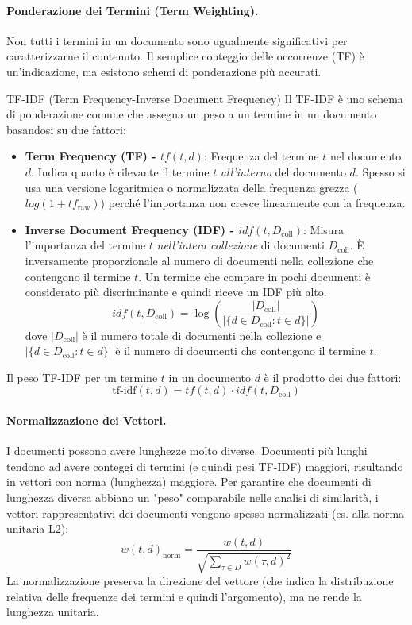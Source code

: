 \documentclass{article}
\begin{document}
\paragraph{Ponderazione dei Termini (Term Weighting).}
Non tutti i termini in un documento sono ugualmente significativi per caratterizzarne il contenuto. Il semplice conteggio delle occorrenze (TF) è un'indicazione, ma esistono schemi di ponderazione più accurati.
\begin{definitionbox}{TF-IDF (Term Frequency-Inverse Document Frequency)}
    Il TF-IDF è uno schema di ponderazione comune che assegna un peso a un termine in un documento basandosi su due fattori:
    \begin{itemize}
        \item \textbf{Term Frequency (TF) - $tf(t,d)$}: Frequenza del termine $t$ nel documento $d$. Indica quanto è rilevante il termine $t$ \textit{all'interno} del documento $d$. Spesso si usa una versione logaritmica o normalizzata della frequenza grezza ($log(1+tf_{\text{raw}})$) perché l'importanza non cresce linearmente con la frequenza.
        \item \textbf{Inverse Document Frequency (IDF) - $idf(t,D_{\text{coll}})$}: Misura l'importanza del termine $t$ \textit{nell'intera collezione} di documenti $D_{\text{coll}}$. È inversamente proporzionale al numero di documenti nella collezione che contengono il termine $t$. Un termine che compare in pochi documenti è considerato più discriminante e quindi riceve un IDF più alto.
              $$ idf(t, D_{\text{coll}}) = \log \left( \frac{|D_{\text{coll}}|}{|\{d \in D_{\text{coll}} : t \in d\}|} \right) $$
              dove $|D_{\text{coll}}|$ è il numero totale di documenti nella collezione e $|\{d \in D_{\text{coll}} : t \in d\}|$ è il numero di documenti che contengono il termine $t$.
    \end{itemize}
    Il peso TF-IDF per un termine $t$ in un documento $d$ è il prodotto dei due fattori:
    $$ \text{tf-idf}(t,d) = tf(t,d) \cdot idf(t, D_{\text{coll}}) $$
\end{definitionbox}

\paragraph{Normalizzazione dei Vettori.}
I documenti possono avere lunghezze molto diverse. Documenti più lunghi tendono ad avere conteggi di termini (e quindi pesi TF-IDF) maggiori, risultando in vettori con norma (lunghezza) maggiore. Per garantire che documenti di lunghezza diversa abbiano un "peso" comparabile nelle analisi di similarità, i vettori rappresentativi dei documenti vengono spesso normalizzati (es. alla norma unitaria L2):
$$ w(t,d)_{\text{norm}} = \frac{w(t,d)}{\sqrt{\sum_{\tau \in D} w(\tau,d)^2}} $$
La normalizzazione preserva la direzione del vettore (che indica la distribuzione relativa delle frequenze dei termini e quindi l'argomento), ma ne rende la lunghezza unitaria.
\end{document}
